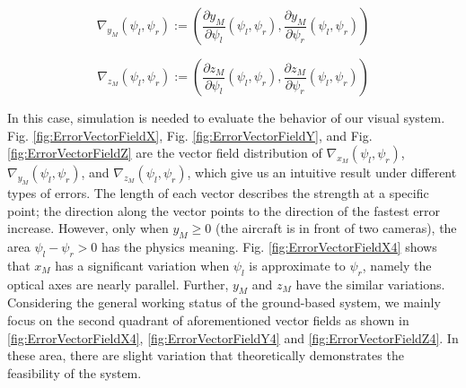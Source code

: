 \begin{equation}
	\nabla_{y_M}(\psi_l, \psi_r):=\left( \frac{\partial y_M}{\partial \psi_l}(\psi_l, \psi_r), \frac{\partial y_M}{\partial \psi_r}(\psi_l, \psi_r)  \right)
\end{equation}

\begin{equation}
	\nabla_{z_M}(\psi_l, \psi_r):=\left( \frac{\partial z_M}{\partial \psi_l}(\psi_l, \psi_r), \frac{\partial z_M}{\partial \psi_r}(\psi_l, \psi_r)  \right)
\end{equation}


In this case, simulation is needed to evaluate the behavior of our visual system. Fig. \ref{fig:ErrorVectorFieldX}, Fig. \ref{fig:ErrorVectorFieldY}, and Fig. \ref{fig:ErrorVectorFieldZ} are the vector field distribution of $\nabla_{x_M}(\psi_l, \psi_r)$, $\nabla_{y_M}(\psi_l, \psi_r)$, and $\nabla_{z_M}(\psi_l, \psi_r)$, which give us an intuitive result under different types of errors. The length of each vector describes the strength at a specific point; the direction along the vector points to the direction of the fastest error increase. However, only when $y_M \geq 0$ (the aircraft is in front of two cameras), the area $\psi_l - \psi_r > 0$ has the physics meaning. Fig. \ref{fig:ErrorVectorFieldX4} shows that $x_M$ has a significant variation when $\psi_l$ is approximate to $\psi_r$, namely the optical axes are nearly parallel. Further, $y_M$ and $z_M$ have the similar variations. Considering the general working status of the ground-based system, we mainly focus on the second  quadrant of aforementioned vector fields as shown in \ref{fig:ErrorVectorFieldX4}, \ref{fig:ErrorVectorFieldY4} and \ref{fig:ErrorVectorFieldZ4}. In these area, there are slight variation that theoretically demonstrates the feasibility of the system. 

 
